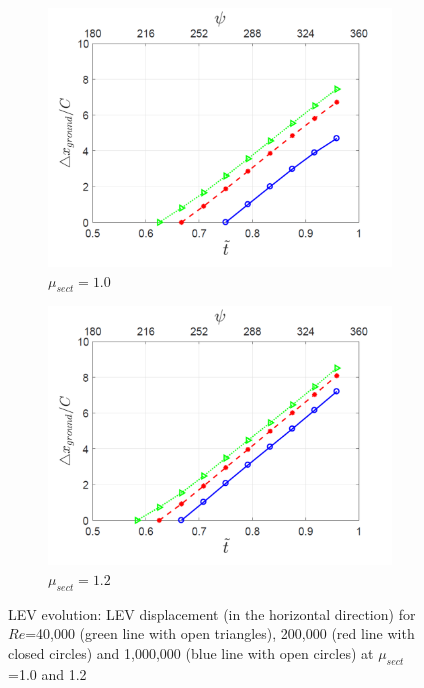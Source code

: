 \begin{figure}[H]
	\begin{subfigure}{0.5\textwidth}
		\includegraphics[width=1\textwidth]{figures/LEV_deltax_lambda_1pt0.png}
		\caption{$\mu_{sect} = 1.0$}
		\label{fig:LEV_deltax_lambda_1p0}
	\end{subfigure}
	\begin{subfigure}{0.5\textwidth}
		\includegraphics[width=1\textwidth]{figures/LEV_deltax_lambda_1pt2.png}
		\caption{$\mu_{sect} = 1.2$}
		\label{fig:LEV_deltax_lambda_1p2}
	\end{subfigure}
	\caption{LEV evolution: LEV displacement (in the horizontal direction) for $Re$=40,000 (green line with open triangles), 200,000 (red line with closed circles) and 1,000,000 (blue line with open circles) at $\mu_{sect}$=1.0 and 1.2}
	\label{fig:LEV_delta_x}
\end{figure}

